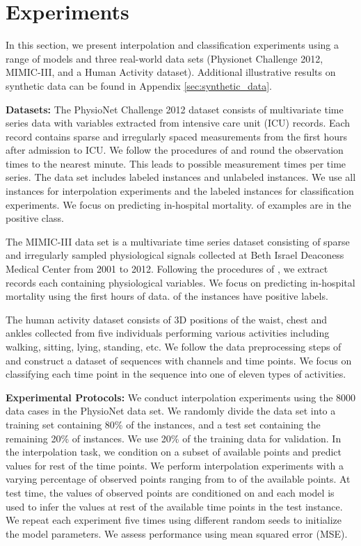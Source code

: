 \vspace{-2em}
\section{Experiments}
In this section, we present interpolation and classification experiments using a range of models and three real-world data sets (Physionet Challenge 2012, MIMIC-III, and a Human Activity dataset). Additional illustrative results on synthetic data can be found in Appendix \ref{sec:synthetic_data}. 

\textbf{Datasets:} The PhysioNet Challenge 2012 dataset \citep{physionet} consists of multivariate time series data with  variables extracted from intensive care unit (ICU) records. Each record contains sparse and irregularly spaced measurements from the first  hours after admission to ICU. We follow the procedures of \citet{Rubanova2019} and round the observation times to the nearest minute. This leads to  possible measurement times per time series. The data set includes  labeled instances and  unlabeled instances.  We use all  instances for interpolation experiments and the  labeled instances for classification experiments. We focus on predicting in-hospital mortality.  of examples are in the positive class.

The MIMIC-III data set \citep{johnson2016mimic} is a multivariate time series dataset consisting of sparse and irregularly sampled physiological signals collected at Beth Israel Deaconess Medical Center from 2001 to 2012. Following the procedures  of \citet{shukla2019}, we extract  records each containing  physiological variables. We focus on predicting in-hospital mortality using the first  hours of data.  of the instances have positive labels.


The human activity dataset consists of 3D positions of the waist, chest and ankles collected from five individuals performing various activities including walking, sitting, lying, standing, etc. We follow the data preprocessing steps of \citet{Rubanova2019} and construct a dataset of  sequences with  channels and  time points.  We focus on classifying each time point in the sequence into one of eleven types of activities. 





\textbf{Experimental Protocols:} 
We conduct interpolation experiments using the 8000 data cases in the PhysioNet data set. We randomly divide the data set into a training set containing 80\% of the instances, and a test set containing the remaining 20\% of instances. We use 20\% of the training data for validation.
In the interpolation task, we condition on a subset of available points and predict values for rest of the time points. We perform interpolation experiments with a varying percentage of observed points ranging from  to  of the available points. At test time, the values of observed points are conditioned on and each model is used to infer the values at rest of the available time points in the test instance. We repeat each experiment five times using different random seeds to initialize the model parameters. We assess performance using mean squared error (MSE).



